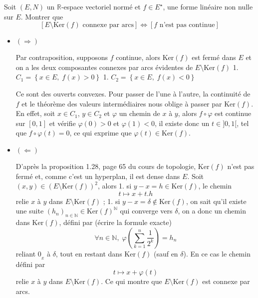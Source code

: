 \begin{question}{}{}
Soit $(E,N)$ un $\mathbb{R}$-espace vectoriel normé et $f\in E^\star$, une forme linéaire non nulle sur $E$. Montrer que
$$\left[E\setminus\mathrm{Ker}(f)\text{ connexe par arcs}\right]\iff\left[f\text{ n'est pas continue}\right]$$
\end{question}

\begin{myproof}{}{}
\begin{itemize}

    \item $(\Longrightarrow)$

Par contraposition, supposons $f$ continue, alors $\mathrm{Ker}(f)$ est fermé dans $E$ et on a les deux composantes connexes par arcs évidentes de $E\setminus\mathrm{Ker}(f)$
1. $C_1=\left\{x\in E,\; f(x)>0\right\}$
1. $C_2=\left\{x\in E,\; f(x)<0\right\}$

Ce sont des ouverts convexes. Pour passer de l'une à l'autre, la continuité de $f$ et le théorème des valeurs intermédiaires nous oblige à passer par $\mathrm{Ker}(f)$. En effet, soit $x\in C_1$, $y\in C_2$ et $\varphi$ un chemin de $x$ à $y$, alors $f\circ\varphi$ est continue sur $[0,1]$ et vérifie $\varphi(0)>0$ et $\varphi(1)<0$, il existe donc un $t\in]0,1[$, tel que $f\circ\varphi(t)=0$, ce qui exprime que $\varphi(t)\in\mathrm{Ker}(f)$.

\item $(\Longleftarrow)$

D'après la proposition 1.28, page 65 du cours de topologie, $\mathrm{Ker}(f)$ n'est pas fermé et, comme c'est un hyperplan, il est dense dans $E$. Soit $(x,y)\in \left(E\setminus\mathrm{Ker}(f)\right)^2$, alors 
1. si $y-x=h\in\mathrm{Ker}(f)$, le chemin 
$$t\longmapsto x+t.h$$
relie $x$ à $y$ dans $E\setminus\mathrm{Ker}(f)$ ;
1. si $y-x=\delta\notin\mathrm{Ker}(f)$, on sait qu'il existe une suite $\left(h_n\right)_{n\in\mathbb{N}}\in \mathrm{Ker}(f)^\mathbb{N}$ qui converge vers $\delta$, on a donc un chemin dans $\mathrm{Ker}(f)$, défini par (écrire la formule exacte)
$$\forall n\in\mathbb{N},\; \varphi\left(\sum_{k=1}^n \frac{1}{2^k}\right)=h_n$$
reliant $0_{_E}$ à $\delta$, tout en restant dans $\mathrm{Ker}(f)$ (sauf en $\delta$). En ce cas le chemin défini par
$$t\longmapsto x+\varphi(t)$$
relie $x$ à $y$ dans $E\setminus\mathrm{Ker}(f)$. Ce qui montre que $E\setminus\mathrm{Ker}(f)$ est connexe par arcs.

\end{itemize}
\end{myproof}

